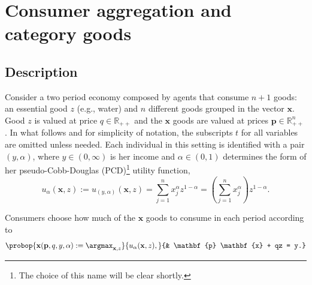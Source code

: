 \documentclass[english, a4paper,12pt]{article}
\begin{document}
\section{Consumer aggregation and category goods} \label{sec:MixedAgg}

\subsection{Description}
Consider a two period economy composed by agents that consume $n+1$ goods: an essential good $z$ (e.g., water) and $n$ different goods grouped in the vector $\mathbf{x}$. Good $z$ is valued at price $q \in \mathbb{R}_{++}$ and the $\mathbf{x}$ goods are valued at prices $\mathbf{p} \in \mathbb{R}^{n}_{++}$.  In what follows and for simplicity of notation, the subscripts $t$ for all variables are omitted unless needed. Each individual in this setting is identified with a pair $(y,\alpha)$, where $y \in (0,\infty)$ is her income and $\alpha \in (0,1)$ determines the form of her pseudo-Cobb-Douglas (PCD)\footnote{The choice of this name will be clear shortly.} utility function,
	$$u_{\alpha}(\mathbf{x},z) := u_{(y,\alpha)}(\mathbf{x},z) = \sum_{j=1}^{n} x_{j}^{\alpha}z^{1-\alpha} = \left(\sum_{j=1}^{n} x_{j}^{\alpha}\right)z^{1-\alpha}.$$

Consumers choose how much of the $\mathbf{x}$ goods to consume in each period according to
	\begin{equation} \label{eq:probdisagg}
		\probop{\mathbf{x}(\mathbf{p}, q, y, \alpha) 
			:= \argmax_{\mathbf{x}, z}}{u_{\alpha}(\mathbf{x}, z),}
				{&	\mathbf{p} \mathbf{x} + qz = y.}
	\end{equation} 
\end{document}
